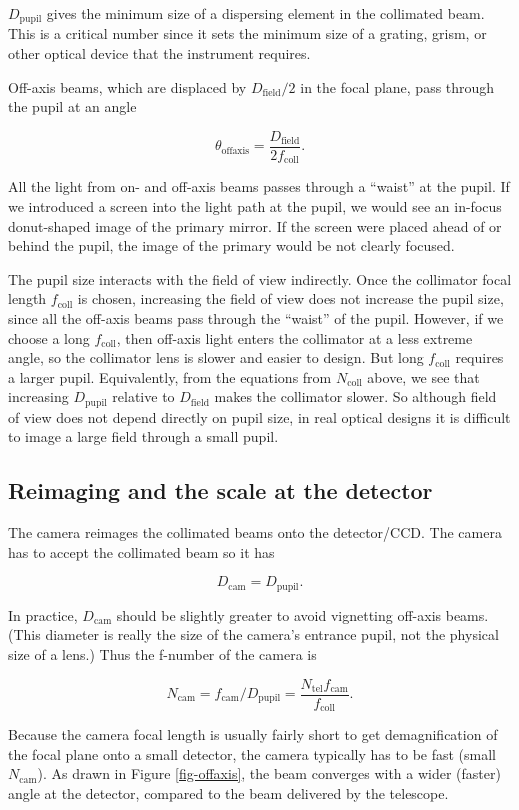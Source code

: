 \documentclass[12pt]{article}
\newcommand{\subscript}[1]{\mathrm{#1}}
\newcommand{\field}{\subscript{field}}
\newcommand{\offaxis}{\subscript{offaxis}}
\newcommand{\tel}{\subscript{tel}}
\newcommand{\pupil}{\subscript{pupil}}
\newcommand{\coll}{\subscript{coll}}
\newcommand{\cam}{\subscript{cam}}
\begin{document}
$D_{\pupil}$ gives the minimum size of a dispersing element in the
collimated beam.  This is a critical number since it sets the
minimum size of a grating, grism, or other optical device that the
instrument requires.

Off-axis beams, which are displaced by 
$D_{\field}/2$ in the focal plane, pass through the pupil at an angle

$$ \theta_{\offaxis} = \frac{D_{\field}}{2f_{\coll}}. $$

All the light from on- and off-axis beams passes 
through a ``waist'' at the pupil.  If we introduced a 
screen into the light path at the pupil, we would see an in-focus
donut-shaped image of the primary mirror.  If the screen
were placed ahead of or behind the pupil, the image of the primary
would be not clearly focused.  

The pupil size interacts with the field of view indirectly.
Once the collimator focal length $f_{\coll}$ is chosen, increasing the 
field of view does not increase the pupil size, since all
the off-axis beams pass through the ``waist'' of the pupil.
However, if we choose a
long $f_{\coll}$, then off-axis light enters the collimator at
a less extreme angle, so the collimator lens is slower and
easier to design.  But long $f_{\coll}$ requires a larger
pupil.  Equivalently, from the equations from $N_{\coll}$ above,
we see that increasing $D_{\pupil}$ relative to $D_{\field}$ makes
the collimator slower.  So although field of view does not
depend directly on pupil size, in real optical designs
it is difficult to
image a large field through a small pupil.

\subsection{Reimaging and the scale at the detector}

The camera reimages the collimated beams onto the detector/CCD.
The camera has to accept the collimated beam so it has

$$ D_{\cam} = D_{\pupil}. $$

In practice, $D_{\cam}$ should be slightly greater to avoid 
vignetting off-axis beams.  (This diameter is really the size of the
camera's entrance pupil, not the physical size of a lens.)  
Thus the f-number of the camera is 

$$ N_{\cam} = f_{\cam} / D_{\pupil} = \frac{N_{\tel} f_{\cam}}{f_{\coll}}. $$

Because the camera focal length is usually fairly short to
get demagnification of the focal plane onto a small detector,
the camera typically has to be fast (small $N_{\cam}$).  As drawn in Figure
\ref{fig-offaxis}, the beam converges with a wider (faster) angle
at the detector, compared to the beam delivered by the telescope.
\end{document}
